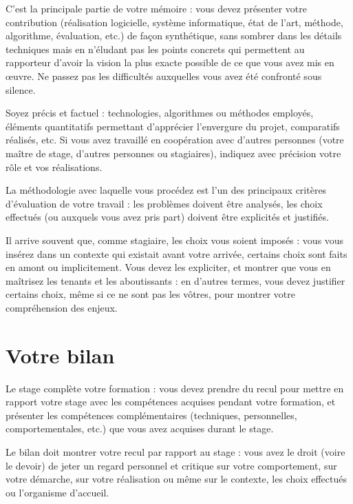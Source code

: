 \documentclass [twoside,openright,a4paper,11pt,french] {report}
\begin{document}
C'est la principale partie de votre mémoire : vous devez présenter votre
contribution (réalisation logicielle, système informatique, état de
l'art, méthode, algorithme, évaluation, etc.) de façon synthétique,
sans sombrer dans les détails techniques mais en n'éludant pas les
points concrets qui permettent au rapporteur d'avoir la vision la plus
exacte possible de ce que vous avez mis en œuvre. Ne passez pas
les difficultés auxquelles vous avez été confronté sous silence.

Soyez précis et factuel : technologies, algorithmes ou méthodes
employés, éléments quantitatifs permettant d'apprécier l'envergure
du projet, comparatifs réalisés, etc. Si vous avez travaillé en
coopération avec d'autres personnes (votre maître de stage, d'autres
personnes ou stagiaires), indiquez avec précision votre rôle et vos
réalisations.

La méthodologie avec laquelle vous procédez est l'un des principaux
critères d'évaluation de votre travail : les problèmes doivent
être analysés, les choix effectués (ou auxquels vous avez pris part)
doivent être explicités et justifiés.

Il arrive souvent que, comme stagiaire, les choix vous soient imposés :
vous vous insérez dans un contexte qui existait avant votre arrivée,
certains choix sont faits en amont ou implicitement. Vous devez
les expliciter, et montrer que vous en maîtrisez les tenants et les
aboutissants : en d'autres termes, vous devez justifier certains choix,
même si ce ne sont pas les vôtres, pour montrer votre compréhension
des enjeux.

\section {Votre bilan}

Le stage complète votre formation : vous devez prendre du recul pour
mettre en rapport votre stage avec les compétences acquises pendant votre
formation, et présenter les compétences complémentaires (techniques,
personnelles, comportementales, etc.) que vous avez acquises durant
le stage.

Le bilan doit montrer votre recul par rapport au stage : vous avez le
droit (voire le devoir) de jeter un regard personnel et critique sur
votre comportement, sur votre démarche, sur votre réalisation ou même
sur le contexte, les choix effectués ou l'organisme d'accueil.


\end{document}
